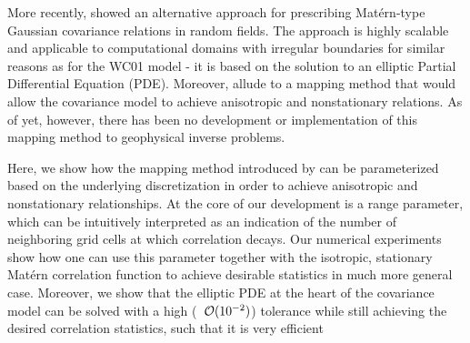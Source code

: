 %

More recently, \citet{RSSB:RSSB777} showed an alternative approach for
prescribing Mat\'ern-type Gaussian covariance relations in random fields.
The approach is highly scalable and applicable to computational domains with
irregular boundaries for similar reasons as for the WC01 model -
it is based on the solution to an elliptic Partial
Differential Equation (PDE).
Moreover, \citet{RSSB:RSSB777} allude to a mapping method that would allow the
covariance model to achieve anisotropic and nonstationary relations.
As of yet, however, there has been no development or implementation of this
mapping method to geophysical inverse problems.

Here, we show how the mapping method introduced by \citet{RSSB:RSSB777}
can be parameterized based on the underlying discretization
in order to achieve anisotropic and nonstationary relationships.
At the core of our development is a range parameter, which can be intuitively
interpreted as an indication of the number of neighboring grid cells at which
correlation decays.
Our numerical experiments show how one can use this parameter together with the
isotropic, stationary Mat\'ern correlation function to achieve desirable
statistics in much more general case.
Moreover, we show that the elliptic PDE at the heart of the covariance model can
be solved with a high (~$\mathcal{O}(10^{-2})$) tolerance while still achieving the
desired correlation statistics, such that it is very efficient




